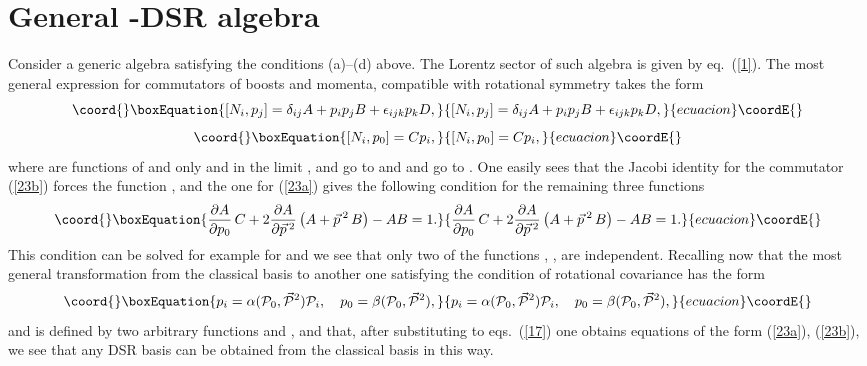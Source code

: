 \documentclass [prd,twocolumn,nofootinbib,showpacs]  {revtex4}
\begin{document}
\section{General \myHighlight{$\kappa$}\coordHE{}-DSR algebra}

Consider a generic algebra satisfying the conditions (a)--(d)
above. The Lorentz sector of such algebra is  given by
eq.~(\ref{1}). The most general expression for commutators of
boosts and momenta, compatible with rotational symmetry takes the
form
\begin{equation}\coord{}\boxEquation{\label{23a}
 [N_i, p_j] = \delta_{ij} A + p_i p_j B + \epsilon_{ijk} p_k D,
}{[N_i, p_j] = \delta_{ij} A + p_i p_j B + \epsilon_{ijk} p_k D,
}{ecuacion}\coordE{}\end{equation}
\begin{equation}\coord{}\boxEquation{\label{23b}
  [N_i, p_0] = C p_i,
}{[N_i, p_0] = C p_i,
}{ecuacion}\coordE{}\end{equation}
where \coordHE{} are functions of \coordHE{} and \coordHE{} only
and in the limit \myHighlight{$\kappa\rightarrow\infty$}\coordHE{}, \coordHE{}  and \coordHE{} go to \coordHE{}
and \coordHE{} and \coordHE{} go to \coordHE{}. One easily sees that the Jacobi
identity for the commutator (\ref{23b})  forces the function \coordHE{}, and the one for (\ref{23a}) gives the following condition for
the remaining three functions
\begin{equation}\coord{}\boxEquation{\label{24}
 \frac{\partial A}{\partial p_0} \, C + 2 \frac{\partial A}{\partial \vec{p}\,{}^2}
 \left(A + \vec{p}\,{}^2 \, B\right) - AB = 1.
}{\frac{\partial A}{\partial p_0} \, C + 2 \frac{\partial A}{\partial \vec{p}\,{}^2}
 \left(A + \vec{p}\,{}^2 \, B\right) - AB = 1.
}{ecuacion}\coordE{}\end{equation}
This condition can be solved for example for \coordHE{} and we see that
only two of the functions  \coordHE{}, \coordHE{}, \coordHE{} are independent.
Recalling now that the most general transformation from the
classical basis to another one satisfying the condition of
rotational covariance has the form
\begin{equation}\coord{}\boxEquation{\label{25}
p_i = \alpha({\cal P}_0, \vec{{\cal    P}}{}^2){\cal P}_i, \quad p_0 = \beta({\cal P}_0, \vec{{\cal    P}}{}^2),
}{p_i = \alpha({\cal P}_0, \vec{{\cal    P}}{}^2){\cal P}_i, \quad p_0 = \beta({\cal P}_0, \vec{{\cal    P}}{}^2),
}{ecuacion}\coordE{}\end{equation}
and is defined by two arbitrary functions \myHighlight{$\alpha$}\coordHE{} and \myHighlight{$\beta$}\coordHE{},
and that, after substituting  to eqs.~(\ref{17}) one obtains
equations of the form (\ref{23a}), (\ref{23b}), we see that any
DSR basis can be obtained from the classical basis in this way.
\end{document}

